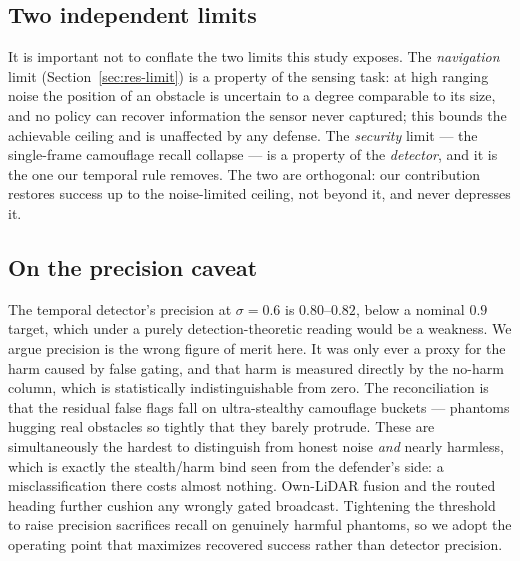
\subsection{Two independent limits}
It is important not to conflate the two limits this study exposes. The
\emph{navigation} limit (Section~\ref{sec:res-limit}) is a property of the
sensing task: at high ranging noise the position of an obstacle is
uncertain to a degree comparable to its size, and no policy can recover
information the sensor never captured; this bounds the achievable ceiling
and is unaffected by any defense. The \emph{security} limit --- the
single-frame camouflage recall collapse --- is a property of the
\emph{detector}, and it is the one our temporal rule removes. The two are
orthogonal: our contribution restores success up to the noise-limited
ceiling, not beyond it, and never depresses it.

\subsection{On the precision caveat}
The temporal detector's precision at $\sigma=0.6$ is $0.80$--$0.82$, below a
nominal $0.9$ target, which under a purely detection-theoretic reading would
be a weakness. We argue precision is the wrong figure of merit here. It was
only ever a proxy for the harm caused by false gating, and that harm is
measured directly by the no-harm column, which is statistically
indistinguishable from zero. The reconciliation is that the residual false
flags fall on ultra-stealthy camouflage buckets --- phantoms hugging real
obstacles so tightly that they barely protrude. These are simultaneously the
hardest to distinguish from honest noise \emph{and} nearly harmless, which
is exactly the stealth/harm bind seen from the defender's side: a
misclassification there costs almost nothing. Own-LiDAR fusion and the
routed heading further cushion any wrongly gated broadcast. Tightening the
threshold to raise precision sacrifices recall on genuinely harmful
phantoms, so we adopt the operating point that maximizes recovered success
rather than detector precision.

